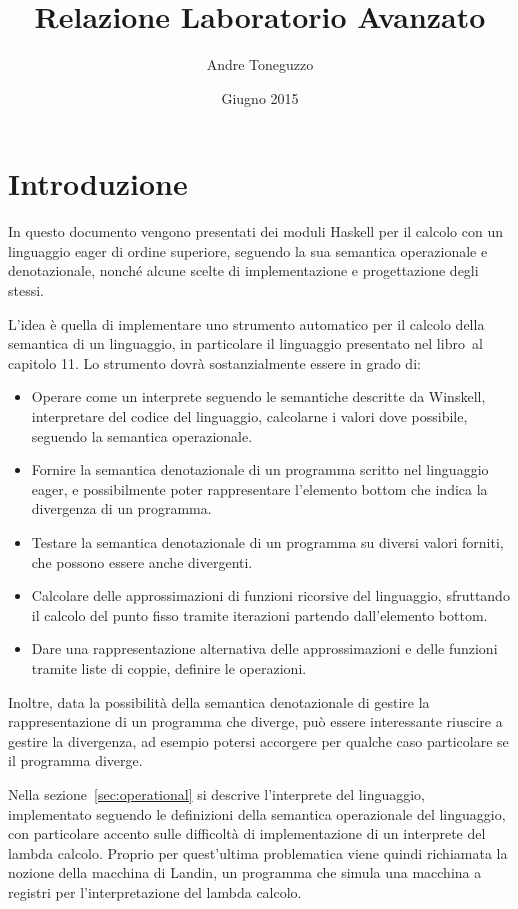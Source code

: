 \documentclass{article}
\title{Relazione Laboratorio Avanzato}
\author{Andre Toneguzzo}
\date{Giugno 2015}
\begin{document}
\maketitle

\section{Introduzione}
In questo documento vengono presentati dei moduli Haskell per il calcolo  con un linguaggio eager di ordine superiore, seguendo la sua semantica operazionale e denotazionale, nonché alcune scelte di implementazione e progettazione degli stessi.

L'idea è quella di implementare uno strumento automatico per il calcolo della semantica di un linguaggio, in particolare il linguaggio presentato nel libro~\cite{Winskel}al capitolo 11. Lo strumento dovrà sostanzialmente essere in grado di:

\begin{itemize}
	\item Operare come un interprete seguendo le semantiche descritte da Winskell, interpretare del codice del linguaggio, calcolarne i valori dove possibile, seguendo la semantica operazionale.
	\item Fornire la semantica denotazionale di un programma scritto nel linguaggio eager, e possibilmente poter rappresentare l'elemento bottom che indica la divergenza di un programma.
	\item Testare la semantica denotazionale di un programma su diversi valori forniti, che possono essere anche divergenti.
	\item Calcolare delle approssimazioni di funzioni ricorsive del linguaggio, sfruttando il calcolo del punto fisso tramite iterazioni partendo dall'elemento bottom.
	\item Dare una rappresentazione alternativa delle approssimazioni e delle funzioni tramite liste di coppie, definire le operazioni.
\end{itemize}
Inoltre, data la possibilità della semantica denotazionale di gestire la rappresentazione di un programma che diverge, può essere interessante riuscire a gestire la divergenza, ad esempio potersi accorgere per qualche caso particolare se il programma diverge.

Nella sezione~\ref{sec:operational} si descrive l'interprete del linguaggio, implementato seguendo le definizioni della semantica operazionale del linguaggio, con particolare accento sulle difficoltà di implementazione di un interprete del lambda calcolo. Proprio per quest'ultima problematica viene quindi richiamata la nozione della macchina di Landin, un programma che simula una macchina a registri per l'interpretazione del lambda calcolo.
\end{document}
